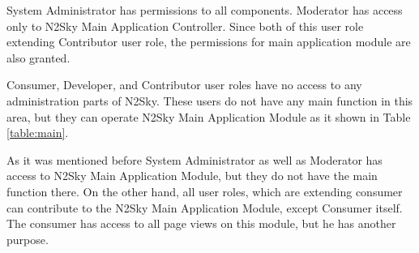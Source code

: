 System Administrator has permissions to all components. Moderator has access only to N2Sky Main Application Controller. Since both of this user role extending Contributor user role, the permissions for main application module are also granted.

Consumer, Developer, and Contributor user roles have no access to any administration parts of N2Sky. These users do not have any main function in this area, but they can operate N2Sky Main Application Module as it shown in Table \ref{table:main}.

\begin{table}[]
\caption{User Roles main functions considering "N2Sky Main Application Module". 
"+" for allowed, "-" for disallowed}
\label{table:main}
\end{table}

As it was mentioned before System Administrator as well as Moderator has access to N2Sky Main Application Module, but they do not have the main function there. On the other hand, all user roles, which are extending consumer can contribute to the N2Sky Main Application Module, except Consumer itself. The consumer has access to all page views on this module, but he has another purpose. 




